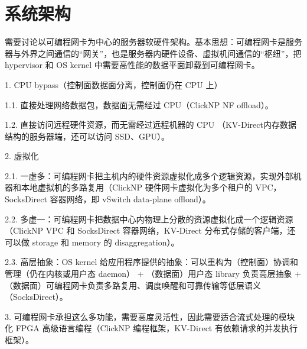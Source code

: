 \chapter{系统架构}

需要讨论以可编程网卡为中心的服务器软硬件架构。基本思想：可编程网卡是服务器与外界之间通信的“网关”，也是服务器内硬件设备、虚拟机间通信的“枢纽”，把 hypervisor 和 OS kernel 中需要高性能的数据平面卸载到可编程网卡。

1. CPU bypass（控制面数据面分离，控制面仍在 CPU 上）

1.1. 直接处理网络数据包，数据面无需经过 CPU（ClickNP NF offload）。

1.2. 直接访问远程硬件资源，而无需经过远程机器的 CPU （KV-Direct内存数据结构的服务器端，还可以访问 SSD、GPU）。

2. 虚拟化

2.1. 一虚多：可编程网卡把主机内的硬件资源虚拟化成多个逻辑资源，实现外部机器和本地虚拟机的多路复用（ClickNP 硬件网卡虚拟化为多个租户的 VPC，SocksDirect 容器网络，即 vSwitch data-plane offload）。

2.2. 多虚一：可编程网卡把数据中心内物理上分散的资源虚拟化成一个逻辑资源（ClickNP VPC 和 SocksDirect 容器网络，KV-Direct 分布式存储的客户端，还可以做 storage 和 memory 的 disaggregation）。

2.3. 高层抽象：OS kernel 给应用程序提供的抽象：可以重构为（控制面）协调和管理（仍在内核或用户态 daemon） + （数据面）用户态 library 负责高层抽象 + （数据面）可编程网卡负责多路复用、调度唤醒和可靠传输等低层语义（SocksDirect）。

3. 可编程网卡承担这么多功能，需要高度灵活性，因此需要适合流式处理的模块化 FPGA 高级语言编程（ClickNP 编程框架，KV-Direct 有依赖请求的并发执行框架）。